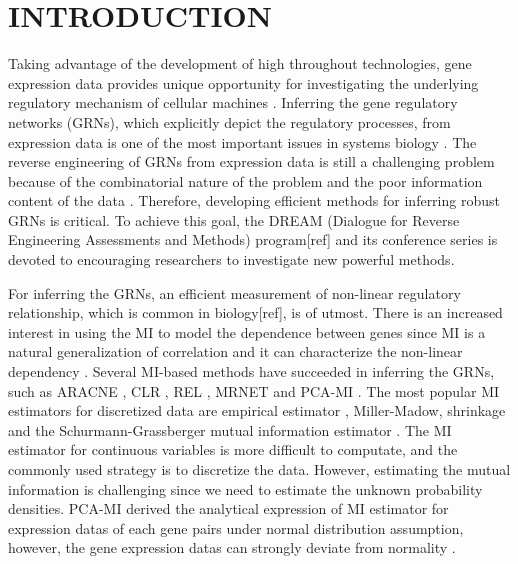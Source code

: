 \documentclass{bioinfo}
\begin{document}
\section{INTRODUCTION}

Taking advantage of the development of high throughout technologies,
gene expression data provides unique opportunity for investigating
the underlying regulatory mechanism of cellular machines
\citep{hughes2000functional}. Inferring the gene regulatory networks
(GRNs), which explicitly depict the regulatory processes, from
expression data is one of the most important issues in systems
biology \citep{basso2005reverse}. The reverse engineering of GRNs
from expression data is still a challenging problem because of the
combinatorial nature of the problem and the poor information content
of the data \citep{margolin2006reverse}. Therefore, developing
efficient methods for inferring robust GRNs is critical. To achieve
this goal, the DREAM (Dialogue for Reverse Engineering Assessments
and Methods) program[ref] and its conference series is devoted to
encouraging researchers to investigate new powerful methods.

For inferring the GRNs, an efficient measurement of non-linear
regulatory relationship, which is common in biology[ref], is of
utmost. There is an increased interest in using the MI to  model the
dependence between genes since MI is a natural generalization of
correlation and it can characterize the non-linear dependency
\citep{brunel2010miss,cover2006elements}.  Several MI-based methods
have succeeded in inferring the GRNs, such as ARACNE
\citep{margolin2006aracne}, CLR \citep{faith2007large}, REL
\citep{butte2000mutual} , MRNET \citep{meyer2008minet}  and PCA-MI
\citep{zhang2012inferring}. The most popular MI estimators for
discretized data are empirical estimator
\citep{paninski2003estimation},
Miller-Madow\citep{paninski2003estimation}, shrinkage
\citep{schafer2005shrinkage} and the Schurmann-Grassberger mutual
information estimator  \citep{schurmann2002entropy}. The MI
estimator for continuous variables is more difficult to computate,
and the commonly used strategy is to discretize the
data\citep{de2012bagging}. However, estimating the mutual
information is challenging since we need to estimate the unknown
probability densities. PCA-MI \citep{zhang2012inferring} derived the
analytical expression of MI estimator for expression datas of each
gene pairs under normal distribution assumption, however,  the gene
expression datas can strongly deviate from normality
\citep{emmert2010local}.
\end{document}
